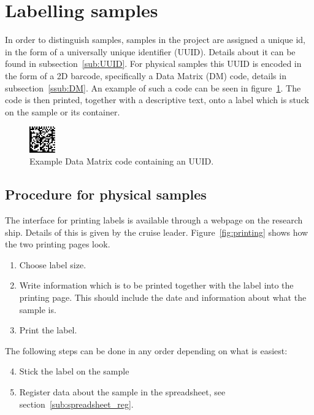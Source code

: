 \documentclass[a4paper,english, 11pt]{article}
\begin{document}
\section{Labelling samples} %
\label{sec:labelling samples}



In order to distinguish samples, samples in the project are assigned a unique id, in the form of a universally unique identifier (UUID). Details about it can be found in subsection~\ref{sub:UUID}. For physical samples this UUID is encoded in the form of a 2D barcode, specifically a Data Matrix (DM) code, details in subsection~\ref{ssub:DM}. An example of such a code can be seen in figure~\ref{fig:data_matrix}. The code is then printed, together with a descriptive text, onto a label which is stuck on the sample or its container.

\begin{figure}[htb]
    \centering
    \includegraphics[width=0.1\textwidth]{Data_matrix.png}
    \caption{\label{fig:data_matrix}
        Example Data Matrix code containing an UUID.
    }

\end{figure}

\subsection{Procedure for physical samples} %
\label{sub:Procedure for physical samples}


The interface for printing labels is available through a webpage on the research ship. Details of this is given by the cruise leader. Figure~\ref{fig:printing} shows how the two printing pages look.

\begin{enumerate}
    \item Choose label size.
    \item Write information which is to be printed together with the label into the printing page. This should include the date and information about what the sample is.
    \item Print the label.  
\end{enumerate}
The following steps can be done in any order depending on what is easiest:
\begin{enumerate}
\setcounter{enumi}{3}
    \item Stick the label on the sample
    \item Register data about the sample in the spreadsheet, see section~\ref{sub:spreadsheet_reg}.
\end{enumerate}
\end{document}

